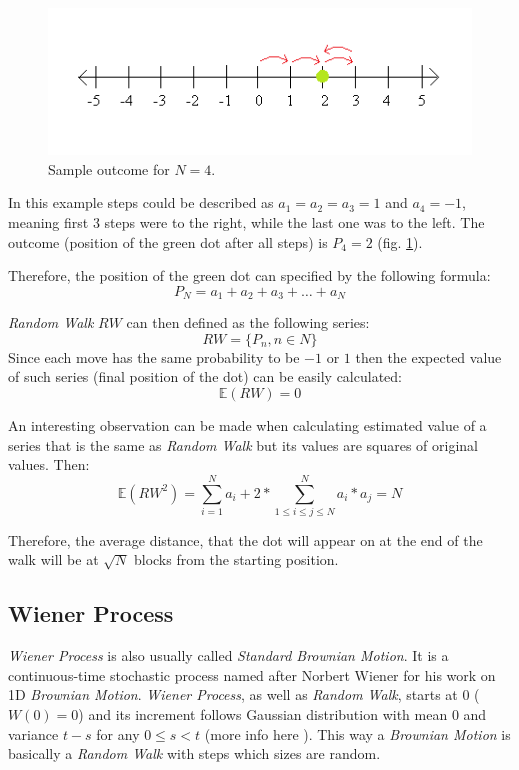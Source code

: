         \begin{figure}[H]
            \centering
            \includegraphics{img/numberLine_end.png}
            \caption{Sample outcome for $N=4$.}
            \label{fig:numberLine_end}
        \end{figure}
        
        In this example steps could be described as $a_1 = a_2 = a_3 = 1$ and $a_4 = -1$, meaning first 3 steps were to the right, while the last one was to the left. The outcome (position of the green dot after all steps) is $P_4 = 2$ (fig. \ref{fig:numberLine_end}).
        
        Therefore, the position of the green dot can specified by the following formula:
        \[  %
        P_N = a_1 + a_2 + a_3 + \ldots + a_N
        \]
        
        \textit{Random Walk} $RW$ can then defined as the following series:
        \[
        RW = \{P_n, n \in N\}
        \]
        Since each move has the same probability to be $-1$ or $1$ then the expected value of such series (final position of the dot) can be easily calculated:
        \[
        \mathbb{E}(RW) = 0
        \]
        
        An interesting observation can be made when calculating estimated value of a series that is the same as \textit{Random Walk} but its values are squares of original values.
        Then:
        \[
        \mathbb{E}({RW}^2) = \sum_{i=1}^{N} a_{i} + 2*\sum_{1 \leq i \leq j \leq N}^{N} a_{i}*a_{j} = N
        \]
        
        Therefore, the average distance, that the dot will appear on at the end of the walk will be at \(\sqrt{N}\) blocks from the starting position.
        
    \subsection{Wiener Process}
        \textit{Wiener Process} is also usually called \textit{Standard Brownian Motion}. It is a continuous-time stochastic process named after Norbert Wiener for his work on 1D \textit{Brownian Motion}.
        \textit{Wiener Process}, as well as \textit{Random Walk}, starts at 0 (\( W(0) = 0 \)) and its increment follows Gaussian distribution with mean \(0\) and variance \(t-s\) for any \(0\leq s < t \) (more info here \cite{wienerProcess}).
        This way a \textit{Brownian Motion} is basically a \textit{Random Walk} with steps which sizes are random.
        
